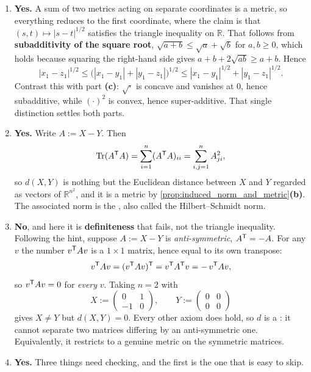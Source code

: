 \begin{exercisesolution}
\begin{enumerate}[label=\textbf{(\alph*)}]
    official hint suggests, and take three collinear points $x := (0,0)$, $y := (1,0)$ and
    $z := (2,0)$:
    \[d(x,z) = 2^2 = 4 \quad > \quad d(x,y) + d(y,z) = 1 + 1 = 2.\]
    Squaring produces the same failure as in
    \cref{ex:metric_axioms_are_needed}\textbf{(c)}: a function growing faster than linearly
    makes one long step more expensive than two short ones.
  \item \textbf{Yes.} A sum of two metrics acting on separate coordinates is a metric, so
    everything reduces to the first coordinate, where the claim is that
    $(s,t) \mapsto |s-t|^{1/2}$ satisfies the triangle inequality on $\mathbb{R}$. That follows
    from \textbf{subadditivity of the square root}, $\sqrt{a+b} \leq \sqrt a + \sqrt b$ for
    $a,b \geq 0$, which holds because squaring the right-hand side gives
    $a+b+2\sqrt{ab} \geq a+b$. Hence
    \[|x_1-z_1|^{1/2} \leq \big(|x_1-y_1| + |y_1-z_1|\big)^{1/2}
      \leq |x_1-y_1|^{1/2} + |y_1-z_1|^{1/2}.\]
    Contrast this with part \textbf{(c)}: $\sqrt{\cdot}$ is concave and vanishes at $0$, hence
    subadditive, while $(\cdot)^2$ is convex, hence super-additive. That single distinction
    settles both parts.
  \item \textbf{Yes.} Write $A := X-Y$. Then
    \[\operatorname{Tr}(A^{\mathsf{T}} A) = \sum_{i=1}^n (A^{\mathsf{T}} A)_{ii} = \sum_{i,j=1}^n A_{ji}^2,\]
    so $d(X,Y)$ is nothing but the Euclidean distance between $X$ and $Y$ regarded as vectors of
    $\mathbb{R}^{n^2}$, and it is a metric by
    \cref{prop:induced_norm_and_metric}\textbf{(b)}. The associated norm is the
     , also called the Hilbert--Schmidt norm.
  \item \textbf{No}, and here it is \textbf{definiteness} that fails, not the triangle
    inequality. Following the hint, suppose $A := X-Y$ is \emph{anti-symmetric},
    $A^{\mathsf{T}} = -A$. For any $v$ the number $v^{\mathsf{T}} Av$ is a $1\times1$ matrix, hence equal to
    its own transpose:
    \[v^{\mathsf{T}} A v = (v^{\mathsf{T}} A v)^{\mathsf{T}} = v^{\mathsf{T}} A^{\mathsf{T}} v = -\,v^{\mathsf{T}} A v,\]
    so $v^{\mathsf{T}} Av = 0$ for \emph{every} $v$. Taking $n=2$ with
    \[X := \begin{pmatrix} 0 & 1 \\ -1 & 0\end{pmatrix}, \qquad
      Y := \begin{pmatrix} 0 & 0 \\ 0 & 0\end{pmatrix}\]
    gives $X \neq Y$ but $d(X,Y) = 0$. Every other axiom does hold, so $d$ is a
     : it cannot separate two matrices
    differing by an anti-symmetric one. Equivalently, it restricts to a genuine metric on the
    symmetric matrices.
  \item \textbf{Yes.} Three things need checking, and the first is the one that is easy to skip.


\end{enumerate}
\end{exercisesolution}
